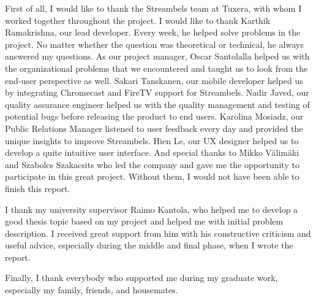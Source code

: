 
First of all, I would like to thank the Streambels team at Tuxera, with whom I worked
together throughout the project. I would like to thank Karthik Ramakrishna, our
lead developer. Every week, he helped solve problems in the project.
No matter whether the question was theoretical or technical, he always answered my
questions. As our project manager, Oscar Santolalla helped us with
the organizational problems that we encountered and taught us to look from the
end-user perspective as well. Sakari Tanskanen, our mobile developer helped us
by integrating Chromecast and FireTV support for Streambels. Nadir Javed, our
quality assurance engineer helped us with the quality management and testing of
potential bugs before releasing the product to end users. Karolina Mosiadz, our
Public Relations Manager listened to user feedback every day and provided the unique
insights to improve Streambels. Hien Le, our UX designer helped us to develop
a quite intuitive user interface. And special thanks to Mikko V{\"a}lim{\"a}ki
and Szabolcs Szakacsits who led the company and gave me the opportunity to participate in
this great project. Without them, I would not have been able to finish this
report.

I thank my university supervisor Raimo Kantola, who helped me to develop a good
thesis topic based on my project and helped me with initial problem description.
I received great support from him with his constructive criticism and useful
advice, especially during the middle and final phase, when I wrote the report.

Finally, I thank everybody who supported me during my graduate work,
especially my family, friends, and housemates.